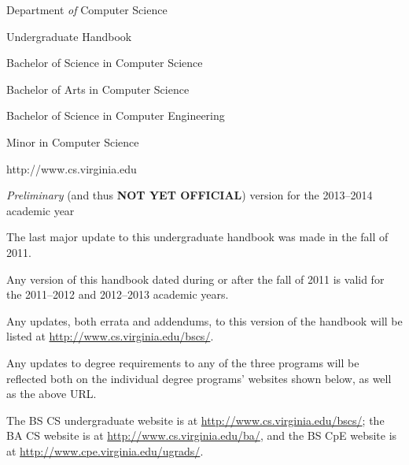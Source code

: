 \documentclass[10pt,letter]{book}
\begin{document}
\pagestyle{empty}

\vspace*{0.5in}

\begin{figure}[h!]
\begin{center}
\end{center}
\end{figure}

\vspace{0.25in}

\begin{center}
{\huge Department {\em of} Computer Science}

{\huge Undergraduate Handbook}

\vspace{1in}

{\Large Bachelor of Science in Computer Science}

{\Large Bachelor of Arts in Computer Science}

{\Large Bachelor of Science in Computer Engineering}

{\Large Minor in Computer Science}

\vspace{1in}

{\large http://www.cs.virginia.edu}

{\large {\em Preliminary} (and thus {\bf NOT YET OFFICIAL}) \linebreak
  version for the 2013--2014 academic year}
\end{center}


\clearpage

\vspace*{1.5in}

\begin{center}
\parbox{3in} {The last major update to this undergraduate handbook was
  made in the fall of 2011.
\newline

Any version of this handbook dated during or after the fall
of 2011 is valid for the 2011--2012 and 2012--2013 academic years.
\newline

Any updates, both errata and addendums, to this version of the
handbook will be listed at \url{http://www.cs.virginia.edu/bscs/}.
\newline

Any updates to degree requirements to any of the three programs will
be reflected both on the individual degree programs' websites shown
below, as well as the above URL.
\newline

The BS CS undergraduate website is at
\url{http://www.cs.virginia.edu/bscs/}; the BA CS website is at
\url{http://www.cs.virginia.edu/ba/}, and the BS CpE website is at
\url{http://www.cpe.virginia.edu/ugrads/}.
\newline

}
\end{center}
\end{document}
